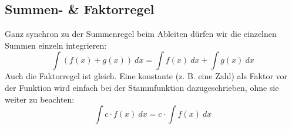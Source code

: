 \subsection{Summen- \& Faktorregel}
Ganz synchron zu der Summenregel beim Ableiten dürfen wir die einzelnen Summen einzeln integrieren:
\[\int (f(x)+g(x))\ dx=\int f(x)\ dx+\int g(x)\ dx\]
Auch die Faktorregel ist gleich. Eine konstante (z. B. eine Zahl) als Faktor vor der Funktion wird einfach bei der Stammfunktion dazugeschrieben, ohne sie weiter zu beachten:
\[\int c\cdot f(x)\ dx=c\cdot \int f(x)\ dx\]
